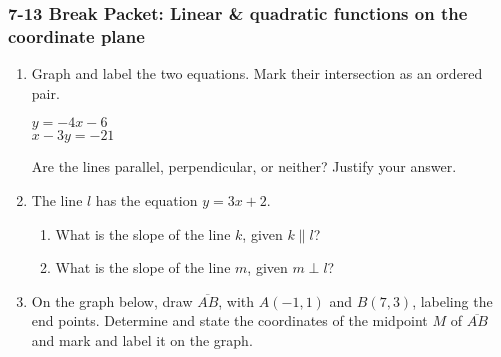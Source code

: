 \documentclass[12pt, twoside]{article}
\begin{document}
\subsubsection*{7-13 Break Packet: Linear \& quadratic functions on the coordinate plane}
  \begin{enumerate}

  \item Graph and label the two equations. Mark their intersection as an ordered pair.

    \begin{multicols}{2}
      $y = -4x-6$ \\
      $x-3y = -21$
    \end{multicols}  \vspace{1cm}
    Are the lines parallel, perpendicular, or neither? Justify your answer.
    \vspace{1.5cm}

    \begin{center} %
    \end{center}

  \item The line $l$ has the equation $y= 3x+2$.
  \begin{enumerate}
    \item What is the slope of the line $k$, given $k \parallel l$?
    \vspace{1cm}
    \item What is the slope of the line $m$, given $m \perp l$?
    \vspace{1cm}
  \end{enumerate}

\newpage

  \item On the graph below, draw $\overline{AB}$, with $A(-1,1)$ and $B(7,3)$, labeling the end points. Determine and state the coordinates of the midpoint $M$ of $\overline{AB}$ and mark and label it on the graph.\\
    \vspace{1.5cm}


\end{enumerate}
\end{document}
